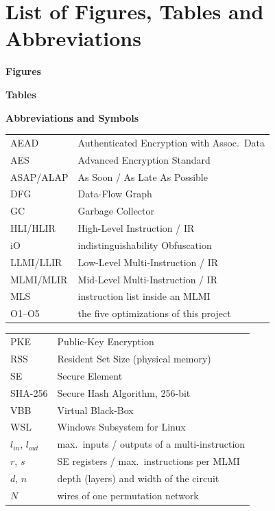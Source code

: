 \documentclass[12pt,a4paper,oneside]{report}
\begin{document}
\chapter*{List of Figures, Tables and Abbreviations}
{\singlespacing
\textbf{Figures}\par\vspace{2pt}
\makeatletter{}\makeatother
\vspace{8pt}\textbf{Tables}\par\vspace{2pt}
\makeatletter{}\makeatother
\vspace{10pt}\textbf{Abbreviations and Symbols}\par\vspace{3pt}
{\footnotesize\renewcommand{\arraystretch}{0.95}
\noindent\begin{tabular}[t]{@{}p{}p{}@{}}
AEAD & Authenticated Encryption with Assoc.\ Data\\
AES & Advanced Encryption Standard\\
ASAP/ALAP & As Soon / As Late As Possible\\
DFG & Data-Flow Graph\\
GC & Garbage Collector\\
HLI/HLIR & High-Level Instruction / IR\\
iO & indistinguishability Obfuscation\\
LLMI/LLIR & Low-Level Multi-Instruction / IR\\
MLMI/MLIR & Mid-Level Multi-Instruction / IR\\
MLS & instruction list inside an MLMI\\
O1--O5 & the five optimizations of this project\\
\end{tabular}\hfill
\begin{tabular}[t]{@{}p{}p{}@{}}
PKE & Public-Key Encryption\\
RSS & Resident Set Size (physical memory)\\
SE & Secure Element\\
SHA-256 & Secure Hash Algorithm, 256-bit\\
VBB & Virtual Black-Box\\
WSL & Windows Subsystem for Linux\\
$l_{in}$, $l_{out}$ & max.\ inputs / outputs of a multi-instruction\\
$r$, $s$ & SE registers / max.\ instructions per MLMI\\
$d$, $n$ & depth (layers) and width of the circuit\\
$N$ & wires of one permutation network\\
\end{tabular}}}
\end{document}

